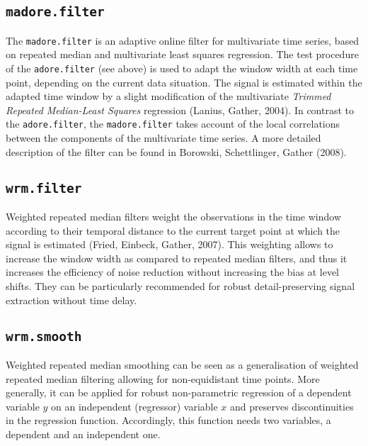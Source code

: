 \documentclass[a4paper]{scrartcl}
\begin{document}
\subsection{\texttt{madore.filter}}

The \texttt{madore.filter} is an adaptive online filter for multivariate time series, based on repeated median and multivariate least squares regression. The test procedure of the \texttt{adore.filter} (see above) is used to adapt the window width at each time point, depending on the current data situation. The signal is estimated within the adapted time window by a slight modification of the multivariate \textit{Trimmed Repeated Median-Least Squares} regression (Lanius, Gather, 2004). In contrast to the \texttt{adore.filter}, the \texttt{madore.filter} takes account of the local correlations between the components of the multivariate time series. A more detailed description of the filter can be found in Borowski, Schettlinger, Gather (2008).
\subsection{\texttt{wrm.filter}}

Weighted repeated median filters weight the observations in the
time window according to their temporal distance to the current
target point at which the signal is estimated (Fried, Einbeck,
Gather, 2007). This weighting allows to increase the window width as compared to
repeated median filters, and thus it increases the
efficiency of noise reduction without increasing the bias at level
shifts. They can be particularly recommended for robust
detail-preserving signal extraction without time delay.

\subsection{\texttt{wrm.smooth}}

Weighted repeated median smoothing can be seen as a generalisation
of weighted repeated median filtering allowing for non-equidistant
time points. More generally, it can be applied for robust
non-parametric regression of a dependent variable $y$ on an
independent (regressor) variable $x$ and preserves discontinuities
in the regression function. Accordingly, this function needs two
variables, a dependent and an independent one.
\end{document}
